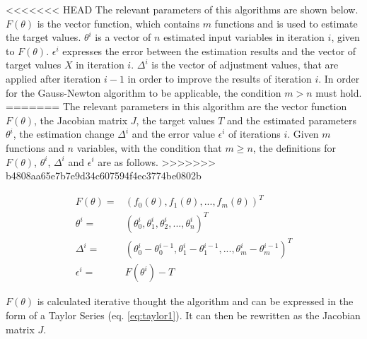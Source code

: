 <<<<<<< HEAD
The relevant parameters of this algorithms are shown below. $F(\theta)$ is the vector function, which contains $m$ functions and is
used to estimate the target values. $\theta^i$ is a vector of $n$ estimated input variables in iteration $i$, given to $F(\theta)$.
$\epsilon^i$ expresses the error between the estimation results and the vector of target values $X$ in iteration $i$.
$\Delta^i$ is the vector of adjustment values, that are applied after iteration $i-1$ in order to improve the results of iteration $i$.
In order for the Gauss-Newton algorithm to be applicable, the condition $m > n$ must hold.
=======
The relevant parameters in this algorithm are the vector function $F(\theta)$, the Jacobian matrix $J$, the target values $T$ and the
estimated parameters $\theta^{i}$, the estimation change $\Delta^{i}$ and the error value $\epsilon^{i}$ of iterations $i$. Given $m$
functions and $n$ variables, with the condition that $m \geq n$, the definitions for $F(\theta)$, $\theta^{i}$, $\Delta^{i}$ and
$\epsilon^{i}$ are as follows.
>>>>>>> b4808aa65e7b7e9d34c607594f4ec3774be0802b

\begin{align}
	F(\theta) =& (f_0(\theta), f_1(\theta),...,f_m(\theta))^T \\
	\theta^{i} =& (\theta^{i}_0, \theta^{i}_1, \theta^{i}_2,...,\theta^{i}_n)^T \\
	\Delta^{i} =& (\theta^{i}_0 - \theta^{i-1}_0, \theta^{i}_1 - \theta^{i-1}_1, ..., \theta^{i}_m - \theta^{i-1}_m)^T \\ %
	\epsilon^{i} =& F(\theta^{i}) - T
\end{align}

$F(\theta)$ is calculated iterative thought the algorithm and can be expressed in the form of a Taylor Series (eq. \ref*{eq:taylor1}). It can
then be rewritten as the Jacobian matrix $J$.

